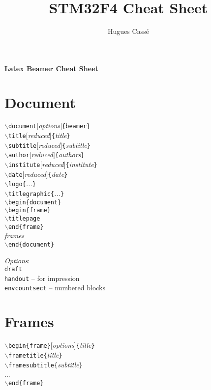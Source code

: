 \documentclass[a4paper,landscape]{article}
\title{STM32F4 Cheat Sheet}
\author{Hugues Cassé}
\newcommand{\cmd}[1]{\texttt{$\backslash$#1}}
\newcommand{\cmdarg}[2]{\texttt{$\backslash$#1\{}\textit{#2}\texttt{\}}}
\newcommand{\dobegin}[1]{\texttt{$\backslash$begin\{#1\}}}
\newcommand{\doend}[1]{\texttt{$\backslash$end\{#1\}}}
\newcommand{\tab}{\hspace*{5mm}}
\begin{document}

\begin{center}
	\textbf{\LARGE Latex Beamer Cheat Sheet}	
\end{center}

\begin{multicols*}{3}

\section*{Document}

\cmd{document}$[$\textit{options}$]$\texttt{\{beamer\}} \\
\cmd{title}$[$\textit{reduced}$]$\texttt{\{}\textit{title}\texttt{\}} \\
\cmd{subtitle}$[$\textit{reduced}$]$\texttt{\{}\textit{subtitle}\texttt{\}} \\
\cmd{author}$[$\textit{reduced}$]$\texttt{\{}\textit{authors}\texttt{\}} \\
\cmd{institute}$[$\textit{reduced}$]$\texttt{\{}\textit{institute}\texttt{\}} \\
\cmd{date}$[$\textit{reduced}$]$\texttt{\{}\textit{date}\texttt{\}} \\
\cmdarg{logo}{...} \\
\cmdarg{titlegraphic}{...} \\

\dobegin{document} \\
	\tab \dobegin{frame} \\
		\tab \tab \cmd{titlepage} \\
	\tab \doend{frame} \\
	\tab \textit{frames} \\
\doend{document}

\medskip
\textit{Options}: \\
	\tab \texttt{draft} \\
	\tab \texttt{handout} -- for impression \\
	\tab \texttt{envcountsect} -- numbered blocks 


\section*{Frames}

\dobegin{frame}[\textit{options}]\texttt{\{}\textit{title}\texttt{\}} \\
	\tab \cmdarg{frametitle}{\textit{title}} \\
	\tab \cmdarg{framesubtitle}{\textit{subtitle}} \\
	\tab ... \\
\doend{frame}


\end{multicols*}
\end{document}
